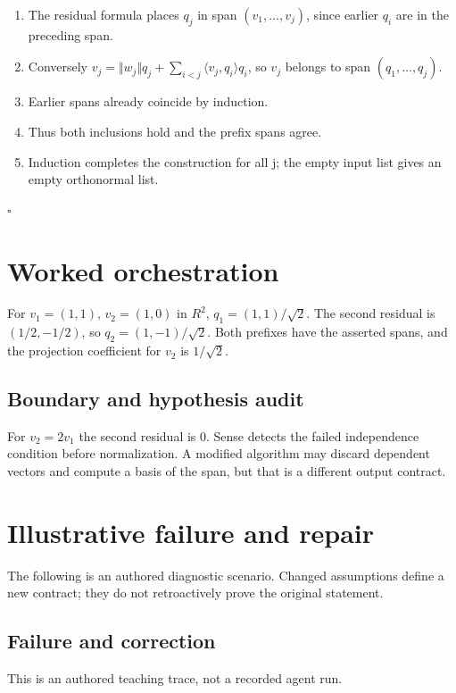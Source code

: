 \documentclass[preprint,12pt,aps,pra,showkeys,amsmath,amssymb,superscriptaddress,floatfix]{revtex4-2}
\theoremstyle{definition}
\theoremstyle{remark}
\begin{document}
\begin{enumerate}
\def\labelenumi{\arabic{enumi}.}
\item
  The residual formula places \(q_j\) in span \((v_{1},\ldots ,v_j)\),
  since earlier \(q_i\) are in the preceding span.
\item
  Conversely
  \(v_j=\Vert w_j\Vert q_j+\sum _{i<j}\langle v_j,q_i\rangle q_i\), so
  \(v_j\) belongs to span \((q_{1},\ldots ,q_j)\).
\item
  Earlier spans already coincide by induction.
\item
  Thus both inclusions hold and the prefix spans agree.
\item
  Induction completes the construction for all j; the empty input list
  gives an empty orthonormal list.
\end{enumerate}

\hfill$\square$

\section{Worked orchestration}

For \(v_{1}=(1,1)\), \(v_{2}=(1,0)\) in \(R^{2}\),
\(q_{1}=(1,1)/\sqrt{2}\). The second residual is \((1/2,-1/2)\), so
\(q_{2}=(1,-1)/\sqrt{2}\). Both prefixes have the asserted spans, and
the projection coefficient for \(v_{2}\) is \(1/\sqrt{2}\).

\subsection{Boundary and hypothesis audit}

For \(v_{2}=2v_{1}\) the second residual is 0. Sense detects the failed
independence condition before normalization. A modified algorithm may
discard dependent vectors and compute a basis of the span, but that is a
different output contract.

\section{Illustrative failure and repair}

The following is an authored diagnostic scenario. Changed assumptions
define a new contract; they do not retroactively prove the original
statement.

\subsection{Failure and correction}
This is an authored teaching trace, not a recorded agent run.
\end{document}
